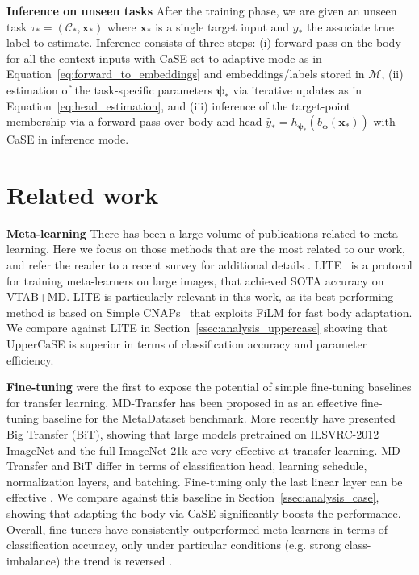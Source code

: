 \documentclass{article}
\begin{document}
\textbf{Inference on unseen tasks} After the training phase, we are given an unseen task $\tau_{\ast} = (\mathcal{C}_{\ast}, \mathbf{x}_{\ast})$ where $\mathbf{x}_{\ast}$ is a single target input and $y_{\ast}$ the associate true label to estimate. Inference consists of three steps: (i) forward pass on the body for all the context inputs with  CaSE set to adaptive mode as in Equation~\eqref{eq:forward_to_embeddings} and embeddings/labels stored in $\mathcal{M}$, (ii) estimation of the task-specific parameters $\boldsymbol{\psi}_{\ast}$ via iterative updates as in Equation~\eqref{eq:head_estimation}, and (iii) inference of the target-point membership via a forward pass over body and head $\hat{y}_{\ast} = h_{\boldsymbol{\psi}_{\ast}} \left( b_{\boldsymbol{\phi}}(\mathbf{x}_{\ast}) \right)$ with CaSE in inference mode.


\section{Related work} \label{sec:related_work}

\textbf{Meta-learning} There has been a large volume of publications related to meta-learning. Here we focus on those methods that are the most related to our work, and refer the reader to a recent survey for additional details \citep{hospedales2020meta}.
LITE~\citep{bronskill2021memory} is a protocol for training meta-learners on large images, that achieved SOTA accuracy on VTAB+MD. LITE is particularly relevant in this work, as its best performing method is based on Simple CNAPs~\citep{bateni2020improved} that exploits FiLM for fast body adaptation. We compare against LITE in Section~\ref{ssec:analysis_uppercase} showing that UpperCaSE is superior in terms of classification accuracy and parameter efficiency.

\textbf{Fine-tuning} \cite{chen2019closer} were the first to expose the potential of simple fine-tuning baselines for transfer learning. MD-Transfer has been proposed in \cite{triantafillou2019meta} as an effective fine-tuning baseline for the MetaDataset benchmark.
More recently \cite{kolesnikov2020big} have presented Big Transfer (BiT), showing that large models pretrained on ILSVRC-2012 ImageNet and the full ImageNet-21k are very effective at transfer learning. MD-Transfer and BiT differ in terms of classification head, learning schedule, normalization layers, and batching. Fine-tuning only the last linear layer can be effective \citep{bauer2017discriminative, tian2020rethinking}. We compare against this baseline in Section~\ref{ssec:analysis_case}, showing that adapting the body via CaSE significantly boosts the performance.
Overall, fine-tuners have consistently outperformed meta-learners in terms of classification accuracy, only under particular conditions (e.g. strong class-imbalance) the trend is reversed \citep{ochal2021few, ochal2021sensitive}.
\end{document}
